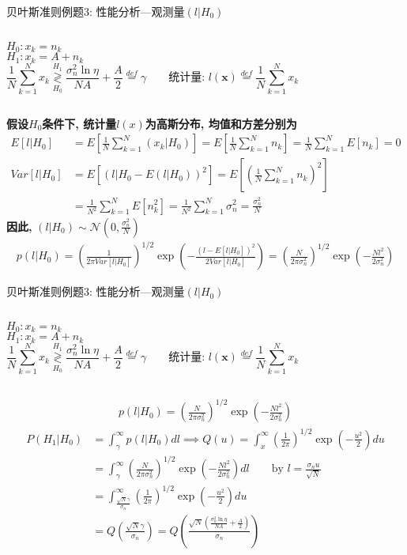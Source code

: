 \begin{frame}[shrink]{贝叶斯准则例题3: 性能分析---观测量$(l|H_0)$}
\begin{columns}
	$H_0:x_k=n_k$\\
	$H_1:x_k=A+n_k$
	\[
	\frac{1}{N}\sum\limits_{k=1}^{N}x_k\mathop{\gtrless}\limits_{H_0}^{H_1}\frac{\sigma_n^2\ln\eta}{NA}+\frac{A}{2}\mathop{=}\limits^{def}\gamma \qquad \textbf{统计量: }l(\bm{x})\mathop{=}\limits^{def}\frac{1}{N}\sum\limits_{k=1}^{N}x_k
	\]
\end{columns}
\textbf{假设$H_0$条件下, 统计量$l(x)$为高斯分布, 均值和方差分别为}
\begin{align*}
E[l|H_0]&=E\left[\frac{1}{N}\sum\limits_{k=1}^{N}(x_k|H_0)\right]=E\left[\frac{1}{N}\sum\limits_{k=1}^{N}n_k\right]=\frac{1}{N}\sum\limits_{k=1}^{N}E[n_k]=0\\
Var[l|H_0]&=E\left[(l|H_0-E(l|H_0))^2\right]=E\left[\left(\frac{1}{N}\sum\limits_{k=1}^{N}n_k\right)^2\right]\\
&=\frac{1}{N^2}\sum\limits_{k=1}^{N}E[n_k^2]=\frac{1}{N^2}\sum\limits_{k=1}^{N}\sigma_n^2=\frac{\sigma_n^2}{N}
\end{align*}
\textbf{因此, }$(l|H_0)\sim\mathcal{N}(0,\frac{\sigma_n^2}{N})$
\begin{align*}
p(l|H_0)=\left(\frac{1}{2\pi Var[l|H_0]}\right)^{1/2}\exp\left(-\frac{(l-E[l|H_0])^2}{2 Var[l|H_0]}\right)=\left(\frac{N}{2\pi\sigma_n^2}\right)^{1/2}\exp\left(-\frac{Nl^2}{2\sigma_n^2}\right)
\end{align*}
\end{frame}

\begin{frame}[shrink]{贝叶斯准则例题3: 性能分析---观测量$(l|H_0)$}
\begin{columns}
	$H_0:x_k=n_k$\\
	$H_1:x_k=A+n_k$
	\[
	\frac{1}{N}\sum\limits_{k=1}^{N}x_k\mathop{\gtrless}\limits_{H_0}^{H_1}\frac{\sigma_n^2\ln\eta}{NA}+\frac{A}{2}\mathop{=}\limits^{def}\gamma \qquad \textbf{统计量: }l(\bm{x})\mathop{=}\limits^{def}\frac{1}{N}\sum\limits_{k=1}^{N}x_k
	\]
\end{columns}
\begin{align*}
p(l|H_0)=\left(\frac{N}{2\pi\sigma_n^2}\right)^{1/2}\exp\left(-\frac{Nl^2}{2\sigma_n^2}\right)
\end{align*}
\begin{align*}
P(H_1|H_0)&=\int_{\gamma}^{\infty}p(l|H_0)dl\implies Q(u)=\int_{x}^{\infty}\left(\frac{1}{2\pi}\right)^{1/2}\exp\left(-\frac{u^2}{2}\right)du\\
&=\int_{\gamma}^{\infty}\left(\frac{N}{2\pi\sigma_n^2}\right)^{1/2}\exp\left(-\frac{Nl^2}{2\sigma_n^2}\right)dl\qquad \text{by } l=\frac{\sigma_nu}{\sqrt{N}}\\
&=\int_{\frac{\sqrt{N}\gamma}{\sigma_n}}^{\infty}\left(\frac{1}{2\pi}\right)^{1/2}\exp\left(-\frac{u^2}{2}\right)du\\
&=Q\left(\frac{\sqrt{N}\gamma}{\sigma_n}\right)=Q\left(\frac{\sqrt{N}\left(\frac{\sigma_n^2\ln\eta}{NA}+\frac{A}{2}\right)}{\sigma_n}\right)
\end{align*}
\end{frame}

